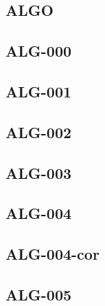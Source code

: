 \begin{multicols}{2}
\section*{ALGO}

\newcommand{\xxexo}{ALG-000}
\subsection*{\xxexo}
\graphicspath{{../../exos/algo/\xxexo/}}



\renewcommand{\xxexo}{ALG-001}
\subsection*{\xxexo}
\graphicspath{{../../exos/algo/\xxexo/}}


\renewcommand{\xxexo}{ALG-002}
\subsection*{\xxexo}
\graphicspath{{../../exos/algo/\xxexo/}}


\renewcommand{\xxexo}{ALG-003}
\subsection*{\xxexo}
\graphicspath{{../../exos/algo/\xxexo/}}


\renewcommand{\xxexo}{ALG-004}
\subsection*{\xxexo}
\graphicspath{{../../exos/algo/\xxexo/}}



\renewcommand{\xxexo}{ALG-004-cor}
\subsection*{\xxexo}
\graphicspath{{../../exos/algo/\xxexo/}}
%

\renewcommand{\xxexo}{ALG-005}
\subsection*{\xxexo}
\graphicspath{{../../exos/algo/\xxexo/}}
%



\end{multicols}
